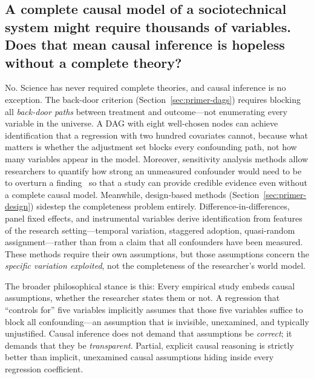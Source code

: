 
\subsection{A complete causal model of a sociotechnical system might require thousands of variables. Does that mean causal inference is hopeless without a complete theory?}

No.
Science has never required complete theories, and causal inference is no exception.
The back-door criterion (Section~\ref{sec:primer-dags}) requires blocking all \emph{back-door paths} between treatment and outcome---not enumerating every variable in the universe.
A DAG with eight well-chosen nodes can achieve identification that a regression with two hundred covariates cannot, because what matters is whether the adjustment set blocks every confounding path, not how many variables appear in the model.
Moreover, sensitivity analysis methods allow researchers to quantify how strong an unmeasured confounder would need to be to overturn a finding~\citep{vanderweele2017sensitivity, oster2019unobservable} so that a study can provide credible evidence even without a complete causal model.
Meanwhile, design-based methods (Section~\ref{sec:primer-design}) sidestep the completeness problem entirely.
Difference-in-differences, panel fixed effects, and instrumental variables derive identification from features of the research setting---temporal variation, staggered adoption, quasi-random assignment---rather than from a claim that all confounders have been measured.
These methods require their own assumptions, but those assumptions concern the \emph{specific variation exploited}, not the completeness of the researcher's world model.

The broader philosophical stance is this: Every empirical study embeds causal assumptions, whether the researcher states them or not.
A regression that ``controls for'' five variables implicitly assumes that those five variables suffice to block all confounding---an assumption that is invisible, unexamined, and typically unjustified.
Causal inference does not demand that assumptions be \emph{correct}; it demands that they be \emph{transparent}.
Partial, explicit causal reasoning is strictly better than implicit, unexamined causal assumptions hiding inside every regression coefficient.


